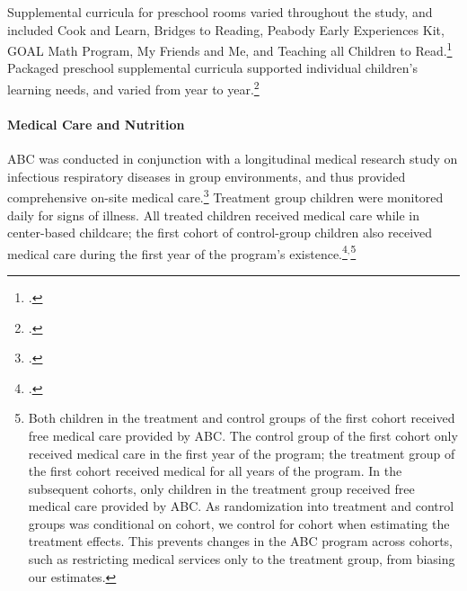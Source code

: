 \begin{appendices}
\noindent Supplemental curricula for preschool rooms varied throughout the study, and included Cook and Learn, Bridges to Reading, Peabody Early Experiences Kit, GOAL Math Program, My Friends and Me, and Teaching all Children to Read.\footnote{ \citet{Greenberg_Epstein_1973_BOOKBridgestoreading,Karnes1973,Dunn_Chun_etal_1976_BOOKPeabodyearlyeducation,Davis_1977_BOOKMyfriends,Wallach_1976_Teaching-All-Children}.} Packaged preschool supplemental curricula supported individual children's learning needs, and varied from year to year.\footnote{ \citet{Ramey_McGinness_etal_1982_Abecedarianapproach,Mcginness_1981_Developing,Finkelstein_1982_Day_Care_YC,Wasik_Ramey_etal_1990_CD}.}\\

\paragraph{Medical Care and Nutrition}
ABC was conducted in conjunction with a longitudinal medical research study on infectious respiratory diseases in group environments, and thus provided comprehensive on-site medical care.\footnote{\citet{Henderson-et-al_1982_NEJoM}.} Treatment group children were monitored daily for signs of illness. All treated children received medical care while in center-based childcare; the first cohort of control-group children also received medical care during the first year of the program's existence.\footnote{\citet{Ramey_Collier_etal_1976_CarolinaAbecedarianProject,Ramey_Campbell_1991_childreninpoverty,Campbell_Ramey_1994_CD}.}$^{,}$\footnote{Both children in the treatment and control groups of the first cohort received free medical care provided by ABC. The control group of the first cohort only received medical care in the first year of the program; the treatment group of the first cohort received medical for all years of the program. In the subsequent cohorts, only children in the treatment group received free medical care provided by ABC. As randomization into treatment and control groups was conditional on cohort, we control for cohort when estimating the treatment effects. This prevents changes in the ABC program across cohorts, such as restricting medical services only to the treatment group, from biasing our estimates.}\\


\end{appendices}

